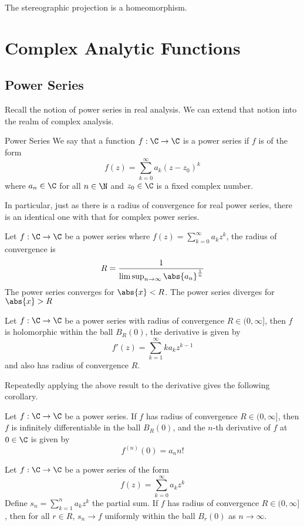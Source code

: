 \documentclass[a4paper]{article}
\begin{document}
\begin{prp}{}{} The stereographic projection is a homeomorphism. 
\end{prp}

\pagebreak
\section{Complex Analytic Functions}
\subsection{Power Series}
Recall the notion of power series in real analysis. We can extend that notion into the realm of complex analysis. 
\begin{defn}{Power Series}{} We say that a function $f:\C\to\C$ is a power series if $f$ is of the form $$f(z)=\sum_{k=0}^{\infty}a_k(z-z_0)^k$$ where $a_n\in\C$ for all $n\in\N$ and $z_0\in\C$ is a fixed complex number. 
\end{defn}

In particular, just as there is a radius of convergence for real power series, there is an identical one with that for complex power series. 

\begin{thm}{}{} Let $f:\C\to\C$ be a power series where $f(z)=\sum_{k=0}^\infty a_kz^k$, the radius of convergence is $$R=\frac{1}{\limsup_{n\to\infty}\abs{a_n}^{\frac{1}{n}}}$$ The power series converges for $\abs{x}<R$. The power series diverges for $\abs{x}>R$
\end{thm}

\begin{thm}{}{} Let $f:\C\to\C$ be a power series with radius of convergence $R\in(0,\infty]$, then $f$ is holomorphic within the ball $B_R(0)$, the derivative is given by $$f'(z)=\sum_{k=1}^\infty ka_kz^{k-1}$$ and also has radius of convergence $R$. 
\end{thm}

Repeatedly applying the above result to the derivative gives the following corollary. 

\begin{crl}{}{} Let $f:\C\to\C$ be a power series. If $f$ has radius of convergence $R\in(0,\infty]$, then $f$ is infinitely differentiable in the ball $B_R(0)$, and the $n$-th derivative of $f$ at $0\in\C$ is given by $$f^{(n)}(0)=a_nn!$$
\end{crl}


\begin{thm}{}{} Let $f:\C\to\C$ be a power series of the form $$f(z)=\sum_{k=0}^\infty a_kz^k$$ Define $s_n=\sum_{k=1}^na_kz^k$ the partial sum. If $f$ has radius of convergence $R\in(0,\infty]$, then for all $r\in R$, $s_n\to f$ uniformly within the ball $B_r(0)$ as $n\to\infty$. 
\end{thm}
\end{document}
